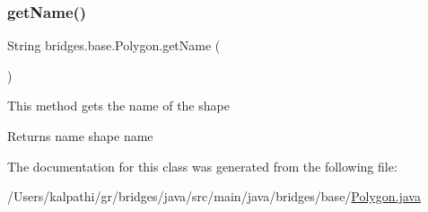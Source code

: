 \subsubsection{\texorpdfstring{getName()}{getName()}}
{\footnotesize\ttfamily String bridges.\+base.\+Polygon.\+get\+Name (\begin{DoxyParamCaption}{ }\end{DoxyParamCaption})}

This method gets the name of the shape

\begin{DoxyReturn}{Returns}
name shape name 
\end{DoxyReturn}


The documentation for this class was generated from the following file\+:\begin{DoxyCompactItemize}
\item 
/\+Users/kalpathi/gr/bridges/java/src/main/java/bridges/base/\mbox{\hyperlink{_polygon_8java}{Polygon.\+java}}\end{DoxyCompactItemize}
